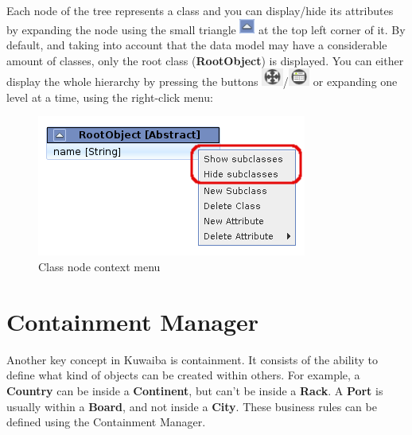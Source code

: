 \documentclass[a4paper]{article}
\begin{document}
			Each node of the tree represents a class and you can display/hide its attributes by expanding the node using the small triangle \includegraphics[width=0.5cm]{img/data_model_manager_triangle.png} at the top left corner of it. By default, and taking into account that the data model may have a considerable amount of classes, only the root class (\textbf{RootObject}) is displayed. You can either display the whole hierarchy by pressing the buttons \includegraphics[width=0.7cm]{img/icon_expand_all.png}/\includegraphics[width=0.7cm]{img/icon_expand_all_with_attributes.png} or expanding one level at a time, using the right-click menu:
			\begin{figure}[h!]
				\centering
				\includegraphics[width=0.5\linewidth]{img/data_model_manager_menu.png}
				\caption{Class node context menu}
				\label{fig:class_hierarchy_context_menu}
			\end{figure}
			
			
	\newpage
	\section{Containment Manager} \label{sec:containment_manager}
	Another key concept in Kuwaiba is containment. It consists of the ability to define what kind of objects can be created within others. For example, a \textbf{Country} can be inside a \textbf{Continent}, but can't be inside a \textbf{Rack}. A \textbf{Port} is usually within a \textbf{Board}, and not inside a \textbf{City}. These business rules can be defined using the Containment Manager.
	
\end{document}
